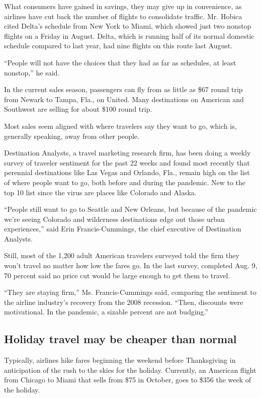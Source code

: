 What consumers have gained in savings, they may give up in convenience,
as airlines have cut back the number of flights to consolidate traffic.
Mr. Hobica cited Delta's schedule from New York to Miami, which showed
just two nonstop flights on a Friday in August. Delta, which is running
half of its normal domestic schedule compared to last year, had nine
flights on this route last August.

``People will not have the choices that they had as far as schedules, at
least nonstop,'' he said.

In the current sales season, passengers can fly from as little as \$67
round trip from Newark to Tampa, Fla., on United. Many destinations on
American and Southwest are selling for about \$100 round trip.

Most sales seem aligned with where travelers say they want to go, which
is, generally speaking, away from other people.

Destination Analysts, a travel marketing research firm, has been doing a
weekly survey of traveler sentiment for the past 22 weeks and found most
recently that perennial destinations like Las Vegas and Orlando, Fla.,
remain high on the list of where people want to go, both before and
during the pandemic. New to the top 10 list since the virus are places
like Colorado and Alaska.

``People still want to go to Seattle and New Orleans, but because of the
pandemic we're seeing Colorado and wilderness destinations edge out
those urban experiences,'' said Erin Francis-Cummings, the chief
executive of Destination Analysts.

Still, most of the 1,200 adult American travelers surveyed told the firm
they won't travel no matter how low the fares go. In the last survey,
completed Aug. 9, 70 percent said no price cut would be large enough to
get them to travel.

``They are staying firm,'' Ms. Francis-Cummings said, comparing the
sentiment to the airline industry's recovery from the 2008 recession.
``Then, discounts were motivational. In the pandemic, a sizable percent
are not budging.''

\hypertarget{holiday-travel-may-be-cheaper-than-normal}{%
\subsection{Holiday travel may be cheaper than
normal}\label{holiday-travel-may-be-cheaper-than-normal}}

Typically, airlines hike fares beginning the weekend before Thanksgiving
in anticipation of the rush to the skies for the holiday. Currently, an
American flight from Chicago to Miami that sells from \$75 in October,
goes to \$356 the week of the holiday.

